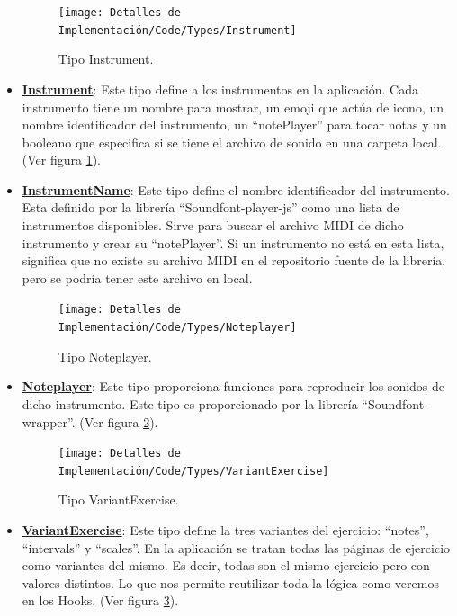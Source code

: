 \documentclass[12pt,twoside,titlepage]{report}
\begin{document}
\begin{itemize}
    \begin{figure}[H]
        \centering
        \texttt{[image: Detalles de Implementación/Code/Types/Instrument]}
        \caption{Tipo Instrument.}
        \label{fig:Instrument}
    \end{figure}

    \item \href{https://github.com/alberttogoca/EarFit/blob/main/src/types/index.ts}{\textbf{Instrument}}: Este tipo define a los instrumentos en la aplicación. Cada instrumento tiene un nombre para mostrar, un emoji que actúa de icono, un nombre identificador del instrumento, un ``notePlayer'' para tocar notas y un booleano que especifica si se tiene el archivo de sonido en una carpeta local. (Ver figura \ref{fig:Instrument}).
    \item \href{https://github.com/alberttogoca/EarFit/blob/main/src/types/index.ts}{\textbf{InstrumentName}}: Este tipo define el nombre identificador del instrumento. Esta definido por la librería ``Soundfont-player-js'' como una lista de instrumentos disponibles. Sirve para buscar el archivo MIDI de dicho instrumento y crear su ``notePlayer''. Si un instrumento no está en esta lista, significa que no existe su archivo MIDI en el repositorio fuente de la librería, pero se podría tener este archivo en local.
    
    \begin{figure}[H]
        \centering
        \texttt{[image: Detalles de Implementación/Code/Types/Noteplayer]}
        \caption{Tipo Noteplayer.}
        \label{fig:Noteplayer}
    \end{figure}

    \item \href{https://github.com/alberttogoca/EarFit/blob/main/src/types/index.ts}{\textbf{Noteplayer}}: Este tipo proporciona funciones para reproducir los sonidos de dicho instrumento. Este tipo es proporcionado por la librería ``Soundfont-wrapper''. (Ver figura \ref{fig:Noteplayer}).

    \begin{figure}[H]
        \centering
        \texttt{[image: Detalles de Implementación/Code/Types/VariantExercise]}
        \caption{Tipo VariantExercise.}
        \label{fig:VariantExercise}
    \end{figure}

    \item \href{https://github.com/alberttogoca/EarFit/blob/main/src/types/index.ts}{\textbf{VariantExercise}}: Este tipo define la tres variantes del ejercicio: ``notes'', ``intervals'' y ``scales''. En la aplicación se tratan todas las páginas de ejercicio como variantes del mismo. Es decir, todas son el mismo ejercicio pero con valores distintos. Lo que nos permite reutilizar toda la lógica como veremos en los Hooks.
    (Ver figura \ref{fig:VariantExercise}).


\end{itemize}
\end{document}
